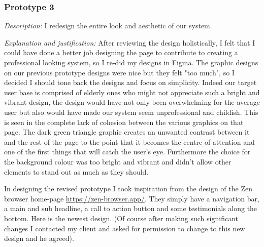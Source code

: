 {\color{gray} \hrulefill}

\subsubsection{Prototype 3}

\textit{Description:}
I redesign the entire look and aesthetic of our system.
\\ \vspace{0.2cm}

\textit{Explanation and justification:}
After reviewing the design holistically, I felt that I could
have done a better job designing the page to contribute to
creating a professional looking system, so I re-did my
designs in Figma. The graphic designs on our previous
prototype designs were nice but they felt "too much",
so I decided I should tone back the designs and focus on
simplicity. Indeed our target user base is comprised of
elderly ones who might not appreciate such a bright and
vibrant design, the design would have not only been
overwhelming for the average user but also would have made
our system seem unprofessional and childish. This is seen
in the complete lack of cohesion between the various graphics
on that page. The dark green triangle graphic creates an
unwanted contrast between it and the rest of the page to the
point that it becomes the centre of attention and one of the
first things that will catch the user's eye.
Furthermore the choice for the background colour
was too bright and vibrant and didn't allow other elements
to stand out as much as they should.\\ \vspace{0.2cm}

In designing the revised
prototype I took inspiration from the design of the
Zen browser home-page \url{https://zen-browser.app/}. They
simply have a navigation bar, a main and sub headline, a call
to action button and some testimonials along the bottom. Here
is the newest design. (Of course after making such significant
changes I contacted my client and asked for permission to
change to this new design and he agreed). \\

